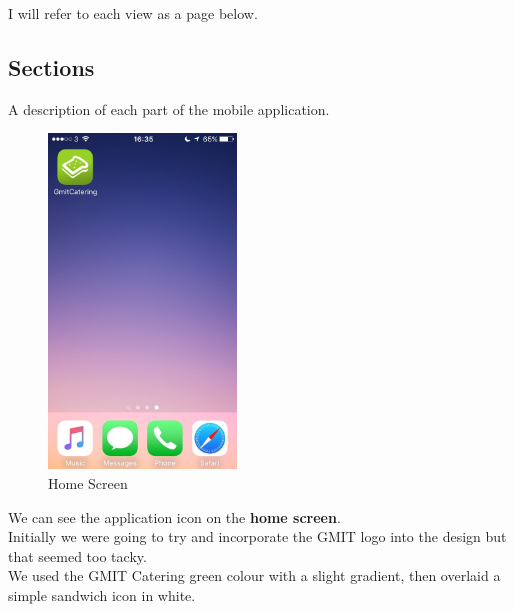 I will refer to each view as a page below.

\subsection{Sections}
A description of each part of the mobile application.
\\

\begin{minipage}{5cm}
	\begin{figure}[H]
		\includegraphics[width=5cm]{img/mobile-app/screen-shots/IMG_2903.jpg}
		\caption{Home Screen}
	\end{figure}
\end{minipage} \hfill
\begin{minipage}{0.55\textwidth}
We can see the application icon on the \textbf{home screen}.
\\

Initially we were going to try and incorporate the GMIT logo into the design but that seemed too tacky.
\\

We used the GMIT Catering green colour with a slight gradient, then overlaid a simple sandwich icon in white.
\end{minipage}

